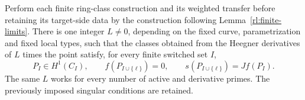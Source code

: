\begin{lemma}\label{rd:derivative}
Perform each finite ring-class construction and its weighted transfer
before retaining its target-side data by the construction following
Lemma~\ref{rl:finite-limits}.  There is one
integer \(L\ne0\), depending on the fixed curve, parametrization and
fixed local types, such that the classes obtained from the Heegner
derivatives of \(L\) times the point satisfy, for every finite switched
set \(I\),
\begin{equation}
 P_I\in H^1(C_I),\qquad
 f(P_{I\cup\{\ell\}})=0,\qquad
 s(P_{I\cup\{\ell\}})=J f(P_I).
 \label{rd:switch}
\end{equation}
The same \(L\) works for every number of active and derivative primes.
The previously imposed singular conditions are retained.
\end{lemma}

